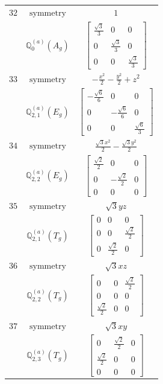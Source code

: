 \documentclass[fleqn,8pt,landscape]{jsarticle}
\begin{document}
\begin{longtable}{ccc}
$ 32 $ & $ \text{symmetry} $ & $ 1 $ \\
$  $ & $ \mathbb{Q}_{0}^{(a)}(A_{g}) $ & $ \begin{bmatrix} \frac{\sqrt{3}}{3} & 0 & 0 \\ 0 & \frac{\sqrt{3}}{3} & 0 \\ 0 & 0 & \frac{\sqrt{3}}{3} \end{bmatrix} $ \\ \hline
$ 33 $ & $ \text{symmetry} $ & $ - \frac{x^{2}}{2} - \frac{y^{2}}{2} + z^{2} $ \\
$  $ & $ \mathbb{Q}_{2,1}^{(a)}(E_{g}) $ & $ \begin{bmatrix} - \frac{\sqrt{6}}{6} & 0 & 0 \\ 0 & - \frac{\sqrt{6}}{6} & 0 \\ 0 & 0 & \frac{\sqrt{6}}{3} \end{bmatrix} $ \\ \hline
$ 34 $ & $ \text{symmetry} $ & $ \frac{\sqrt{3} x^{2}}{2} - \frac{\sqrt{3} y^{2}}{2} $ \\
$  $ & $ \mathbb{Q}_{2,2}^{(a)}(E_{g}) $ & $ \begin{bmatrix} \frac{\sqrt{2}}{2} & 0 & 0 \\ 0 & - \frac{\sqrt{2}}{2} & 0 \\ 0 & 0 & 0 \end{bmatrix} $ \\ \hline
$ 35 $ & $ \text{symmetry} $ & $ \sqrt{3} y z $ \\
$  $ & $ \mathbb{Q}_{2,1}^{(a)}(T_{g}) $ & $ \begin{bmatrix} 0 & 0 & 0 \\ 0 & 0 & \frac{\sqrt{2}}{2} \\ 0 & \frac{\sqrt{2}}{2} & 0 \end{bmatrix} $ \\ \hline
$ 36 $ & $ \text{symmetry} $ & $ \sqrt{3} x z $ \\
$  $ & $ \mathbb{Q}_{2,2}^{(a)}(T_{g}) $ & $ \begin{bmatrix} 0 & 0 & \frac{\sqrt{2}}{2} \\ 0 & 0 & 0 \\ \frac{\sqrt{2}}{2} & 0 & 0 \end{bmatrix} $ \\ \hline
$ 37 $ & $ \text{symmetry} $ & $ \sqrt{3} x y $ \\
$  $ & $ \mathbb{Q}_{2,3}^{(a)}(T_{g}) $ & $ \begin{bmatrix} 0 & \frac{\sqrt{2}}{2} & 0 \\ \frac{\sqrt{2}}{2} & 0 & 0 \\ 0 & 0 & 0 \end{bmatrix} $ \\ \hline

\end{longtable}
\end{document}
